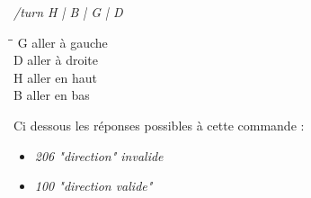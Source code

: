 \par

\textit{/turn {H | B | G | D}}

\begin{tabbing}
\hspace{1cm}\=\hspace{2cm}\=\kill
G \>  aller à \> gauche \\
D \>  aller à \> droite \\
H \>  aller en \> haut \\
B \>  aller en \> bas
\end{tabbing} 

Ci dessous les réponses possibles à cette commande :
\begin{itemize}
	\item \textit{206 "direction" invalide}
	\item \textit{100 "direction valide"} \\
\end{itemize}
